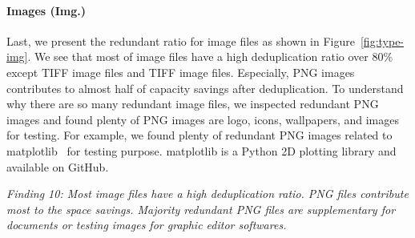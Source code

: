 \paragraph{Images (Img.)}

Last, we present the redundant ratio for image files as shown in Figure~\ref{fig:type-img}.
We see that most of image files have a high deduplication ratio over 80\% except TIFF image files and TIFF image files. Especially, PNG images contributes to almost half of capacity savings after deduplication.
To understand why there are so many redundant image files, we inspected redundant PNG images and found plenty of PNG images are logo, icons, wallpapers, and images for testing. 
For example, we found plenty of redundant PNG images related to matplotlib~\cite{xxx} for testing purpose. matplotlib is a Python 2D plotting library and available on GitHub.

\textit{Finding 10: Most image files have a high deduplication ratio. PNG files contribute most to the space savings. Majority redundant PNG files are supplementary for documents or testing images for graphic editor softwares.}
%



